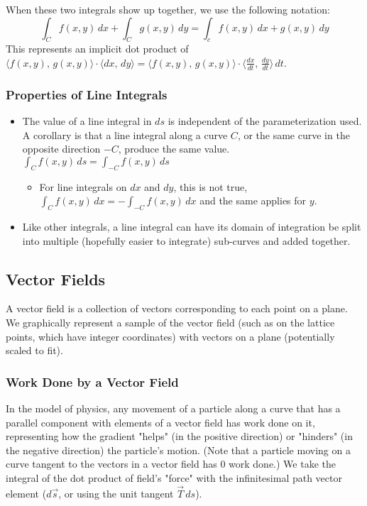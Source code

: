 \documentclass{article}
\newcommand{\vect}[1]{\ensuremath{\overrightarrow{#1}}}
\begin{document}
When these two integrals show up together, we use the following notation:
$$\int_Cf(x,y)\,dx+\int_Cg(x,y)\,dy=\int_cf(x,y)\,dx+g(x,y)\,dy$$
This represents an implicit dot product of $\langle f(x,y),\,g(x,y)\rangle\cdot\langle dx,\,dy\rangle=\langle f(x,y),\,g(x,y)\rangle\cdot\langle \frac{dx}{dt},\,\frac{dy}{dt}\rangle\,dt$.
\subsubsection{Properties of Line Integrals}
\begin{itemize}
    \item The value of a line integral in $ds$ is independent of the parameterization used. A corollary is that a line integral along a curve $C$, or the same curve in the opposite direction $-C$, produce the same value. $\int_C f(x,y)\,ds=\int_{-C}f(x,y)\,ds$
    \begin{itemize}
        \item For line integrals on $dx$ and $dy$, this is not true, $\int_Cf(x,y)\,dx=-\int_{-C}f(x,y)\,dx$ and the same applies for $y$.
    \end{itemize}
    \item Like other integrals, a line integral can have its domain of integration be split into multiple (hopefully easier to integrate) sub-curves and added together.
\end{itemize}

\subsection{Vector Fields}
A vector field is a collection of vectors corresponding to each point on a plane. We graphically represent a sample of the vector field (such as on the lattice points, which have integer coordinates) with vectors on a plane (potentially scaled to fit).
\subsubsection{Work Done by a Vector Field}
In the model of physics, any movement of a particle along a curve that has a parallel component with elements of a vector field has work done on it, representing how the gradient "helps" (in the positive direction) or "hinders" (in the negative direction) the particle's motion. (Note that a particle moving on a curve tangent to the vectors in a vector field has 0 work done.) We take the integral of the dot product of field's "force" with the infinitesimal path vector element ($d\vect{s}$, or using the unit tangent $\vect{T}\,ds$).
\end{document}
